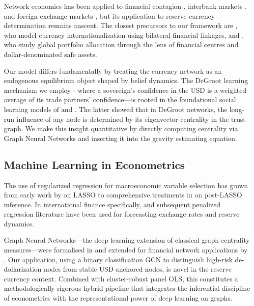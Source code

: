 \documentclass[12pt, letterpaper]{article}
\theoremstyle{definition}
\begin{document}
Network economics has been applied to financial contagion \citep{acemoglu2015systemic}, interbank markets \citep{allen2000financial}, and foreign exchange markets \citep{gabaix2021exchange}, but its application to reserve currency determination remains nascent. The closest precursors to our framework are \citet{liao2020renminbi}, who model currency internationalisation using bilateral financial linkages, and \citet{maggiori2020international}, who study global portfolio allocation through the lens of financial centres and dollar-denominated safe assets.

Our model differs fundamentally by treating the currency network as an endogenous equilibrium object shaped by belief dynamics. The DeGroot learning mechanism we employ---where a sovereign's confidence in the USD is a weighted average of its trade partners' confidence---is rooted in the foundational social learning models of \citet{degroot1974reaching} and \citet{golub2010naive}. The latter showed that in DeGroot networks, the long-run influence of any node is determined by its eigenvector centrality in the trust graph. We make this insight quantitative by directly computing centrality via Graph Neural Networks and inserting it into the gravity estimating equation.

\subsection{Machine Learning in Econometrics}

The use of regularized regression for macroeconomic variable selection has grown from early work by \citet{tibshirani1996regression} on LASSO to comprehensive treatments in \citet{belloni2014inference} on post-LASSO inference. In international finance specifically, \citet{hoerl1970ridge} and subsequent penalized regression literature have been used for forecasting exchange rates and reserve dynamics.

Graph Neural Networks---the deep learning extension of classical graph centrality measures---were formalised in \citet{kipf2017semi} and extended for financial network applications by \citet{jiang2020graph}. Our application, using a binary classification GCN to distinguish high-risk de-dollarization nodes from stable USD-anchored nodes, is novel in the reserve currency context. Combined with cluster-robust panel OLS, this constitutes a methodologically rigorous hybrid pipeline that integrates the inferential discipline of econometrics with the representational power of deep learning on graphs.
\end{document}
